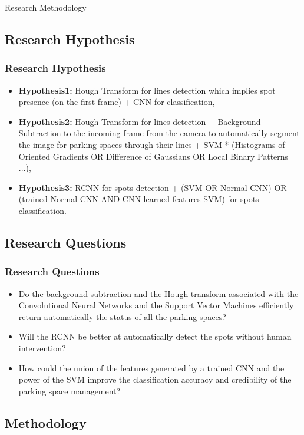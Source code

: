 \documentclass{beamer}
\begin{document}
\begin{frame}
\Huge Research Methodology
\end{frame}

\subsection{Research Hypothesis}

\begin{frame}
\frametitle{Research Hypothesis}
\begin{itemize}
	\item \textbf{Hypothesis1: }Hough Transform for lines detection which implies spot presence (on the first frame) + CNN for classification,
	\item \textbf{Hypothesis2: }Hough Transform for lines detection + Background Subtraction to the incoming frame from the camera to automatically segment the image for parking spaces through their lines + SVM * (Histograms of Oriented Gradients OR  Difference of Gaussians OR Local Binary Patterns ...),
	\item \textbf{Hypothesis3: } RCNN for spots detection + (SVM OR Normal-CNN) OR (trained-Normal-CNN AND CNN-learned-features-SVM) for spots classification.
\end{itemize}

\end{frame}

\subsection{Research Questions}

\begin{frame}
\frametitle{Research Questions}
\begin{itemize}
	\item Do the background subtraction and the Hough transform associated with the Convolutional Neural Networks and the Support Vector Machines efficiently return automatically the status of all the parking spaces?
	\item Will the RCNN be better at automatically detect the spots without human intervention?
	\item How could the union of the features generated by a trained CNN and the power of the SVM improve the classification accuracy and credibility of the parking space management? 
\end{itemize}
\end{frame}

\subsection{Methodology}
\end{document}
